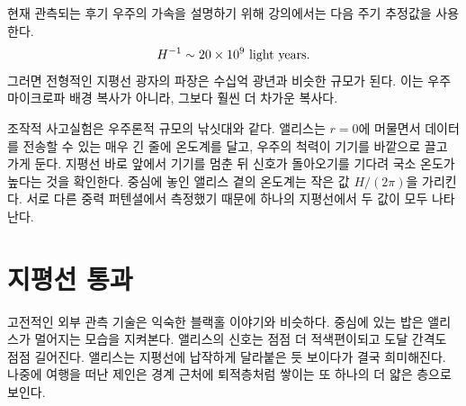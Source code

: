 
현재 관측되는 후기 우주의 가속을 설명하기 위해 강의에서는 다음 주기 추정값을 사용한다.
\begin{equation}
H^{-1}\sim 20\times10^9\ {\rm light\ years}.
\label{eq:l09-lecture-horizon-estimate}
\end{equation}
그러면 전형적인 지평선 광자의 파장은 수십억 광년과 비슷한 규모가 된다. 이는 우주 마이크로파 배경 복사가 아니라, 그보다 훨씬 더 차가운 복사다.

조작적 사고실험은 우주론적 규모의 낚싯대와 같다. 앨리스는 \(r=0\)에 머물면서 데이터를 전송할 수 있는 매우 긴 줄에 온도계를 달고, 우주의 척력이 기기를 바깥으로 끌고 가게 둔다. 지평선 바로 앞에서 기기를 멈춘 뒤 신호가 돌아오기를 기다려 국소 온도가 높다는 것을 확인한다. 중심에 놓인 앨리스 곁의 온도계는 작은 값 \(H/(2\pi)\)을 가리킨다. 서로 다른 중력 퍼텐셜에서 측정했기 때문에 하나의 지평선에서 두 값이 모두 나타난다.

\section{지평선 통과}

고전적인 외부 관측 기술은 익숙한 블랙홀 이야기와 비슷하다. 중심에 있는 밥은 앨리스가 멀어지는 모습을 지켜본다. 앨리스의 신호는 점점 더 적색편이되고 도달 간격도 점점 길어진다. 앨리스는 지평선에 납작하게 달라붙은 듯 보이다가 결국 희미해진다. 나중에 여행을 떠난 제인은 경계 근처에 퇴적층처럼 쌓이는 또 하나의 더 얇은 층으로 보인다.

\begin{classroomqa}
\end{classroomqa}

\begin{classroomqa}
\end{classroomqa}

